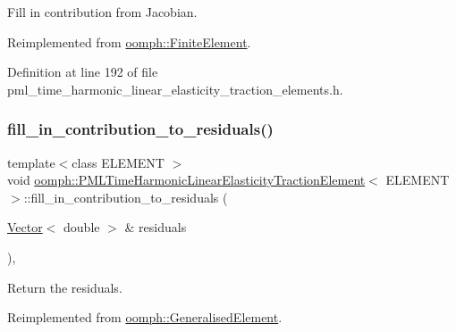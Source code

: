 Fill in contribution from Jacobian. 



Reimplemented from \hyperlink{classoomph_1_1FiniteElement_a0ae7af222af38a0d53bf283dc85bdfea}{oomph\+::\+Finite\+Element}.



Definition at line 192 of file pml\+\_\+time\+\_\+harmonic\+\_\+linear\+\_\+elasticity\+\_\+traction\+\_\+elements.\+h.

\mbox{\label{classoomph_1_1PMLTimeHarmonicLinearElasticityTractionElement_ae1452136ed8ce12c00470c97266521e9}} 
\subsubsection{\texorpdfstring{fill\+\_\+in\+\_\+contribution\+\_\+to\+\_\+residuals()}{fill\_in\_contribution\_to\_residuals()}}
{\footnotesize\ttfamily template$<$class E\+L\+E\+M\+E\+NT $>$ \\
void \hyperlink{classoomph_1_1PMLTimeHarmonicLinearElasticityTractionElement}{oomph\+::\+P\+M\+L\+Time\+Harmonic\+Linear\+Elasticity\+Traction\+Element}$<$ E\+L\+E\+M\+E\+NT $>$\+::fill\+\_\+in\+\_\+contribution\+\_\+to\+\_\+residuals (\begin{DoxyParamCaption}\item[{\hyperlink{classoomph_1_1Vector}{Vector}$<$ double $>$ \&}]{residuals }\end{DoxyParamCaption})\hspace{0.3cm}{\ttfamily [inline]}, {\ttfamily [virtual]}}



Return the residuals. 



Reimplemented from \hyperlink{classoomph_1_1GeneralisedElement_a310c97f515e8504a48179c0e72c550d7}{oomph\+::\+Generalised\+Element}.



